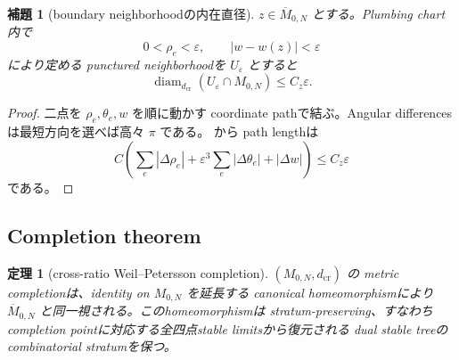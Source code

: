 \documentclass[11pt,a4paper]{ltjsarticle}
\newcommand{\diam}{\operatorname{diam}}
\newcommand{\ov}{\overline}
\theoremstyle{plain}
\newtheorem{theorem}{定理}[section]
\newtheorem{lemma}[lemma]{補題}
\theoremstyle{definition}
\theoremstyle{remark}
\begin{document}
\begin{lemma}[boundary neighborhoodの内在直径]
\label{lem:local-diameter}
$z\in\ov M_{0,N}$ とする。Plumbing chart内で
\[
 0<\rho_e<\varepsilon,
 \qquad |w-w(z)|<\varepsilon
\]
により定める punctured neighborhoodを $U_\varepsilon$ とすると
\[
 \diam_{d_{\mathrm{cr}}}(U_\varepsilon\cap M_{0,N})
 \le C_z\varepsilon.
\]
\end{lemma}

\begin{proof}
二点を $\rho_e,\theta_e,w$ を順に動かす coordinate pathで結ぶ。Angular differencesは最短方向を選べば高々 $\pi$ である。 から path lengthは
\[
 C\left(\sum_e|\Delta\rho_e|
 +\varepsilon^3\sum_e|\Delta\theta_e|+|\Delta w|\right)
 \le C_z\varepsilon
\]
である。
\end{proof}

\subsection{Completion theorem}
\begin{theorem}[cross-ratio Weil--Petersson completion]
\label{thm:wp-completion}
$(M_{0,N},d_{\mathrm{cr}})$ の metric completionは、identity on $M_{0,N}$ を延長する canonical homeomorphismにより $\ov M_{0,N}$ と同一視される。このhomeomorphismは stratum-preserving、すなわち completion pointに対応する全四点stable limitsから復元される dual stable treeのcombinatorial stratumを保つ。
\end{theorem}
\end{document}
